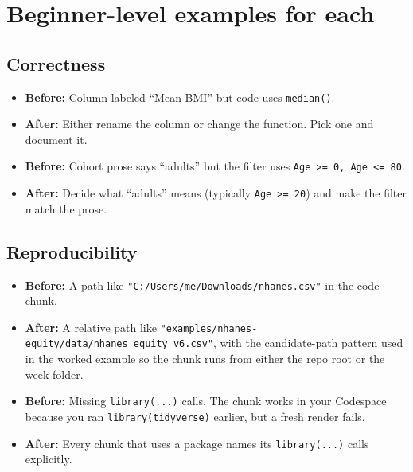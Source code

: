 \documentclass[
  letterpaper,
  DIV=11,
  numbers=noendperiod,
  oneside]{scrreprt}
\begin{document}
\section*{Beginner-level examples for
each}\label{beginner-level-examples-for-each}


\subsection*{Correctness}\label{correctness}

\begin{itemize}
\item
  \textbf{Before:} Column labeled ``Mean BMI'' but code uses
  \texttt{median()}.
\item
  \textbf{After:} Either rename the column or change the function. Pick
  one and document it.
\item
  \textbf{Before:} Cohort prose says ``adults'' but the filter uses
  \texttt{Age\ \textgreater{}=\ 0,\ Age\ \textless{}=\ 80}.
\item
  \textbf{After:} Decide what ``adults'' means (typically
  \texttt{Age\ \textgreater{}=\ 20}) and make the filter match the
  prose.
\end{itemize}

\subsection*{Reproducibility}\label{reproducibility-1}

\begin{itemize}
\item
  \textbf{Before:} A path like
  \texttt{"C:/Users/me/Downloads/nhanes.csv"} in the code chunk.
\item
  \textbf{After:} A relative path like
  \texttt{"examples/nhanes-equity/data/nhanes\_equity\_v6.csv"}, with
  the candidate-path pattern used in the worked example so the chunk
  runs from either the repo root or the week folder.
\item
  \textbf{Before:} Missing \texttt{library(...)} calls. The chunk works
  in your Codespace because you ran \texttt{library(tidyverse)} earlier,
  but a fresh render fails.
\item
  \textbf{After:} Every chunk that uses a package names its
  \texttt{library(...)} calls explicitly.
\end{itemize}
\end{document}
